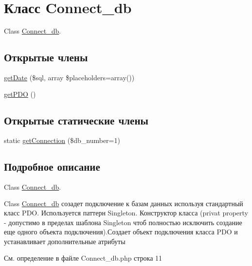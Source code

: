\hypertarget{class_connect__db}{\section{Класс Connect\-\_\-db}
\label{class_connect__db}
}


Class \hyperlink{class_connect__db}{Connect\-\_\-db}.  


\subsection*{Открытые члены}
\begin{DoxyCompactItemize}
\item 
\hyperlink{class_connect__db_a064a8657e9547cedc4e1590fb8c7747f}{get\-Date} (\$sql, array \$placeholders=array())
\item 
\hyperlink{class_connect__db_af708fa20ff0c04a5a9bd8badd63e632c}{get\-P\-D\-O} ()
\end{DoxyCompactItemize}
\subsection*{Открытые статические члены}
\begin{DoxyCompactItemize}
\item 
static \hyperlink{class_connect__db_ab6bc68b89cd8ca077dd8ab2c5a357f06}{get\-Connection} (\$db\-\_\-number=1)
\end{DoxyCompactItemize}


\subsection{Подробное описание}
Class \hyperlink{class_connect__db}{Connect\-\_\-db}. 

Class \hyperlink{class_connect__db}{Connect\-\_\-db} созадет подключение к базам данных используя стандартный класс P\-D\-O. Используется паттерн Singleton. Конструктор класса (privat property -\/ допустимо в пределах шаблона Singleton чтоб полностью исключить создание еще одного объекта подключения).Создает объект подключения класса P\-D\-O и устанавливает дополнительные атрибуты 

См. определение в файле Connect\-\_\-db.\-php строка 11



